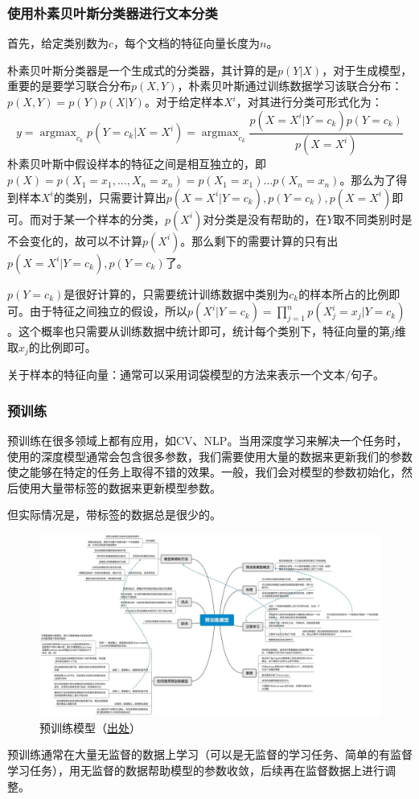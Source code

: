 \subsubsection{使用朴素贝叶斯分类器进行文本分类}
首先，给定类别数为$c$，每个文档的特征向量长度为$n$。

朴素贝叶斯分类器是一个生成式的分类器，其计算的是$p(Y | X)$，对于生成模型，重要的是要学习联合分布$p(X, Y)$，朴素贝叶斯通过训练数据学习该联合分布：$p(X, Y) = p(Y)p(X|Y)$。对于给定样本$X^i$，对其进行分类可形式化为：
$$
y = \mathop{argmax}_{c_k} p(Y=c_k | X=X^i) = \mathop{argmax}_{c_k} \frac{p(X=X^i | Y=c_k) p(Y=c_k)}{p(X=X^i)}
$$
朴素贝叶斯中假设样本的特征之间是相互独立的，即$p(X)=p(X_1=x_1, ..., X_n=x_n) = p(X_1=x_1) ... p(X_n=x_n)$。那么为了得到样本$X^i$的类别，只需要计算出$p(X=X^i | Y=c_k),  p(Y=c_k), p(X=X^i)$即可。而对于某一个样本的分类，$p(X^i)$对分类是没有帮助的，在$Y$取不同类别时是不会变化的，故可以不计算$p(X^i)$。那么剩下的需要计算的只有出$p(X=X^i | Y=c_k),  p(Y=c_k)$了。

$p(Y=c_k)$是很好计算的，只需要统计训练数据中类别为$c_k$的样本所占的比例即可。由于特征之间独立的假设，所以$p(X^i | Y=c_k) = \prod_{j=1}^{n} p(X_{j}^{i}=x_j | Y=c_k)$。这个概率也只需要从训练数据中统计即可，统计每个类别下，特征向量的第$j$维取$x_j$的比例即可。

关于样本的特征向量：通常可以采用词袋模型的方法来表示一个文本/句子。


\subsubsection{预训练}
预训练在很多领域上都有应用，如CV、NLP。当用深度学习来解决一个任务时，使用的深度模型通常会包含很多参数，我们需要使用大量的数据来更新我们的参数使之能够在特定的任务上取得不错的效果。一般，我们会对模型的参数初始化，然后使用大量带标签的数据来更新模型参数。

但实际情况是，带标签的数据总是很少的。

\begin{figure}[h]
	\centering
	\includegraphics[width=\textwidth]{pics/pre-train.jpg}
	\caption{预训练模型（\href{https://www.zhihu.com/question/327642286/answer/1215812016}{出处}）}
	\label{fig:pre-train}
\end{figure}
预训练通常在大量无监督的数据上学习（可以是无监督的学习任务、简单的有监督学习任务），用无监督的数据帮助模型的参数收敛，后续再在监督数据上进行调整。


